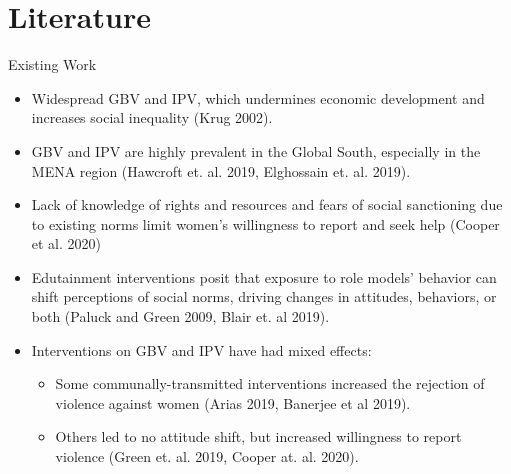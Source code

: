 \documentclass[10pt]{beamer}
\begin{document}

\section{Literature}
\begin{frame}{Existing Work}
\begin{itemize}
    \item Widespread GBV and IPV, which undermines economic development and increases social inequality   \small(Krug 2002). \normalsize
    \item GBV and IPV are highly prevalent in the Global South, especially in the MENA region \small(Hawcroft et. al. 2019, Elghossain et. al. 2019). \normalsize 
    \item Lack of knowledge of rights and resources and fears of social sanctioning due to existing norms limit women’s willingness to report and seek help (Cooper et al. 2020)
    \item Edutainment interventions posit that exposure to role models' behavior can shift perceptions of social norms, driving changes in attitudes, behaviors, or both  \small(Paluck and Green 2009, Blair et. al 2019). \normalsize
    \item Interventions on  GBV and IPV have had mixed effects:
    \begin{itemize}
        \item Some communally-transmitted interventions increased the rejection of violence against women \small(Arias 2019, Banerjee et al 2019). \normalisize
        \item Others led to no attitude shift, but increased willingness to report violence \small(Green et. al. 2019, Cooper at. al. 2020).  
    \end{itemize} \normalisize

\end{itemize}
\end{frame}
\end{document}
